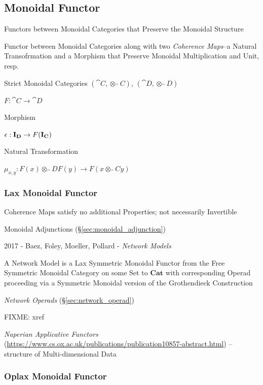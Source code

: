 \subsection{Monoidal Functor}\label{sec:monoidal_functor}

Functors between Monoidal Categories that Preserve the Monoidal
Structure

Functor between Monoidal Categories along with two \emph{Coherence
  Maps}--a Natural Transofrmation and a Morphism that Preserve
Monoidal Multiplication and Unit, resp.

Strict Monoidal Categories $(\cat{C},\otimes_\cat{C})$,
$(\cat{D},\otimes_\cat{D})$

$F : \cat{C} \rightarrow \cat{D}$

Morphism

$\epsilon : \mathbf{I}_\mathbf{D} \rightarrow F(\mathbf{I}_\mathbf{C})$

Natural Transformation

$\mu_{x,y} : F(x) \otimes_\cat{D} F(y) \rightarrow F(x \otimes_\cat{C} y)$



\subsubsection{Lax Monoidal Functor}\label{sec:lax_monoidal_functor}

Coherence Maps satisfy no additional Properties; not necessarily Invertible

Monoidal Adjunctions (\S\ref{sec:monoidal_adjunction})

2017 - Baez, Foley, Moeller, Pollard - \emph{Network Models}

A Network Model is a Lax Symmetric Monoidal Functor from the Free Symmetric
Monoidal Category on some Set to $\mathbf{Cat}$ with corresponding Operad
proceeding via a Symmetric Monoidal version of the Grothendieck Construction

\emph{Network Operads} (\S\ref{sec:network_operad})

FIXME: xref

\emph{Naperian Applicative Functors}
(\url{https://www.cs.ox.ac.uk/publications/publication10857-abstract.html}) --
structure of Multi-dimensional Data



\subsubsection{Oplax Monoidal Functor}\label{sec:oplax_monoidal_functor}

